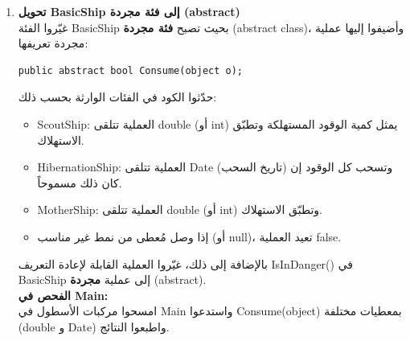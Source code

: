 \documentclass[14pt]{extarticle}
\begin{document}
\begin{enumerate}[label=\textbf{تمرين \arabic*:}, wide=0pt, leftmargin=*, itemsep=2.2em]

    \item \textbf{تحويل \textenglish{BasicShip} إلى فئة مجردة (\textenglish{abstract})} \\
    غيّروا الفئة \textenglish{BasicShip} بحيث تصبح \textbf{فئة مجردة} (\textenglish{abstract class})، وأضيفوا إليها عملية مجردة تعريفها:
    \begin{boxCode}
    \begin{english}
    \begin{verbatim}
public abstract bool Consume(object o);
    \end{verbatim}
    \end{english}
    \end{boxCode}
    حدّثوا الكود في الفئات الوارثة بحسب ذلك:
    \begin{itemize}
        \item \textenglish{ScoutShip}: العملية تتلقى \textenglish{double} (أو \textenglish{int}) يمثل كمية الوقود المستهلكة وتطبّق الاستهلاك.
        \item \textenglish{HibernationShip}: العملية تتلقى \textenglish{Date} (تاريخ السحب) وتسحب كل الوقود إن كان ذلك مسموحاً.
        \item \textenglish{MotherShip}: العملية تتلقى \textenglish{double} (أو \textenglish{int}) وتطبّق الاستهلاك.
        \item إذا وصل مُعطى من نمط غير مناسب (أو \textenglish{null})، تعيد العملية \textenglish{false}.
    \end{itemize}
    بالإضافة إلى ذلك، غيّروا العملية القابلة لإعادة التعريف \textenglish{IsInDanger()} في \textenglish{BasicShip} إلى عملية \textbf{مجردة} (\textenglish{abstract}). \\
    \textbf{الفحص في \textenglish{Main}:} \\
    امسحوا مركبات الأسطول في \textenglish{Main} واستدعوا \textenglish{Consume(object)} بمعطيات مختلفة (\textenglish{double} و \textenglish{Date}) واطبعوا النتائج.


\end{enumerate}
\end{document}
